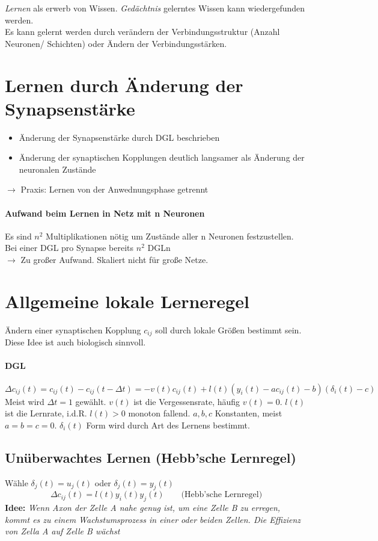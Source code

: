 \emph{Lernen} als erwerb von Wissen. \emph{Gedächtnis} gelerntes Wissen kann wiedergefunden werden.\\
Es kann gelernt werden  durch verändern der Verbindungsstruktur (Anzahl Neuronen/ Schichten) oder Ändern der Verbindungsstärken. 

\section{Lernen durch Änderung der Synapsenstärke}
\begin{itemize}
    \item Änderung der Synapsenstärke durch DGL beschrieben
    \item Änderung der synaptischen Kopplungen deutlich langsamer als Änderung der neuronalen Zustände
\end{itemize}
$\rightarrow$ Praxis: Lernen von der Anwednungsphase getrennt

\paragraph{Aufwand beim Lernen in Netz mit n Neuronen}
Es sind $n^2$ Multiplikationen nötig um Zustände aller n Neuronen festzustellen. Bei einer DGL pro Synapse bereits $n^2$ DGLn\\
$\rightarrow$ Zu großer Aufwand. Skaliert nicht für große Netze.

\section{Allgemeine lokale Lerneregel}
Ändern einer synaptischen Kopplung $c_{ij}$ soll durch lokale Größen bestimmt sein. Diese Idee ist auch biologisch sinnvoll.
\paragraph{DGL}
\begin{equation*}
    \Delta c_{ij}(t) = c_{ij}(t) - c_{ij}(t-\Delta t) = -v(t)c_{ij}(t)+l(t)(y_i(t)-ac_{ij}(t)-b)(\delta_i(t)-c)
\end{equation*}
Meist wird $\Delta t=1$ gewählt. $v(t)$ ist die Vergessensrate, häufig $v(t) = 0$. $l(t)$ ist die Lernrate, i.d.R. $l(t)>0$ monoton fallend. $a,b,c$ Konstanten, meist $a=b=c=0$. $\delta_i(t)$ Form wird durch Art des Lernens bestimmt.

\subsection{Unüberwachtes Lernen (Hebb'sche Lernregel)}
Wähle $\delta_j(t) = u_j(t)$ oder $\delta_j(t) = y_j(t)$\\
\begin{equation*}
    \Delta c_{ij}(t) = l(t)y_i(t)y_j(t) \qquad \text{(Hebb'sche Lernregel)}
\end{equation*}
\textbf{Idee:} \textit{Wenn Axon der Zelle A nahe genug ist, um eine Zelle B zu erregen, kommt es zu einem Wachstumsprozess in einer oder beiden Zellen. Die Effizienz von Zella A auf Zelle B wächst}

